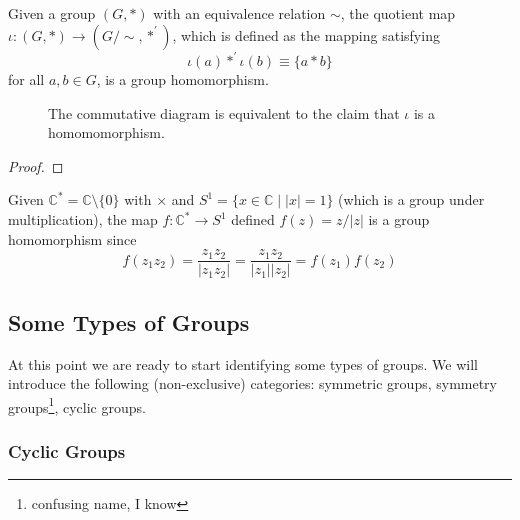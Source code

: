   \begin{theorem}
    Given a group $(G, \ast)$ with an equivalence relation $\sim$, the quotient map $\iota: (G, \ast) \rightarrow (G/\sim, \ast^\prime)$, which is defined as the mapping satisfying 
    \begin{equation}
      \iota(a) *^\prime \iota(b) \equiv \{ a \ast b \} 
    \end{equation}
    for all $a, b \in G$, is a group homomorphism. 

    \begin{figure}[H]
      \centering 
      \caption{The commutative diagram is equivalent to the claim that $\iota$ is a homomomorphism.} 
      \label{fig:quotient_homomorphism}
    \end{figure}
  \end{theorem}
  \begin{proof}
    
  \end{proof} 

  \begin{example}
    Given $\mathbb{C}^\ast = \mathbb{C} \setminus \{0\}$ with $\times$ and $S^1 = \{x \in \mathbb{C} \mid |x| = 1\}$ (which is a group under multiplication), the map $f: \mathbb{C}^\ast \rightarrow S^1$ defined $f(z) = z/|z|$ is a group homomorphism since 
    \begin{equation}
      f(z_1 z_2) = \frac{z_1 z_2}{|z_1 z_2|} = \frac{z_1 z_2}{|z_1| |z_2|} = f(z_1) f(z_2)
    \end{equation}
  \end{example} 

\subsection{Some Types of Groups} 

  At this point we are ready to start identifying some types of groups. We will introduce the following (non-exclusive) categories: symmetric groups, symmetry groups\footnote{confusing name, I know}, cyclic groups. 

\subsubsection{Cyclic Groups}

